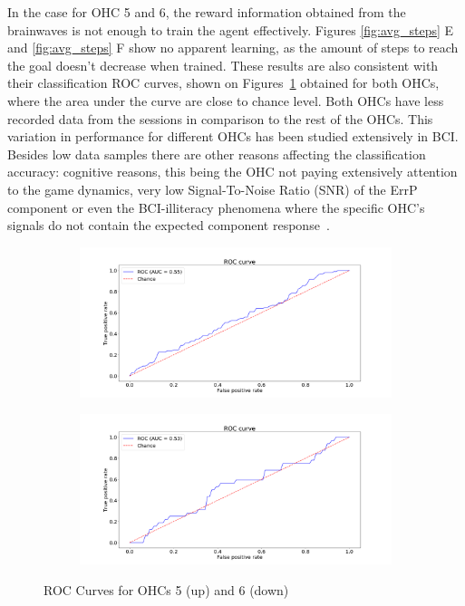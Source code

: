 \documentclass[journal]{IEEEtran}
\begin{document}
{{In the case for OHC 5 and 6, the reward information obtained from the brainwaves is not enough to train the agent effectively. Figures \ref{fig:avg_steps} E and \ref{fig:avg_steps} F show no apparent learning, as the amount of steps to reach the goal doesn't decrease when trained.  These results are also consistent with their classification ROC curves, shown on Figures~\ref{fig:rocsubjects} obtained for both OHCs, where the area under the curve are close to chance level.  Both OHCs have less recorded data from the sessions in comparison to the rest of the OHCs.   This variation in performance for different OHCs has been studied extensively in BCI.  Besides low data samples there are other reasons affecting the classification accuracy:  cognitive reasons, this being the OHC not paying extensively attention to the game dynamics, very low Signal-To-Noise Ratio (SNR) of the ErrP component or even the BCI-illiteracy phenomena where the specific OHC's signals do not contain the expected component response~\cite{Yousefi2019}.

\begin{figure}[h!]
\captionsetup[subfigure]{justification=centering}
\begin{subfigure}{0.25\textwidth}
    \centering
    \includegraphics[scale=0.2]{Images/Classification_test/roc_e.png}
\end{subfigure}
\begin{subfigure}{0.25\textwidth}
    \centering
    \includegraphics[scale=0.2]{Images/Classification_test/roc_f.png}  
\end{subfigure}
\caption{ROC Curves for OHCs 5 (up) and 6 (down)}
\label{fig:rocsubjects}
\end{figure}

}}
\end{document}
